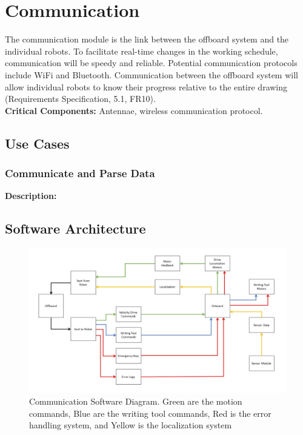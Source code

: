 
\section{Communication}
\label{sec:communication}
The communication module is the link between the offboard system and the individual robots. To facilitate real-time changes in the working schedule, communication will be speedy and reliable. Potential communication protocols include WiFi and Bluetooth. Communication between the offboard system will allow individual robots to know their progress relative to the entire drawing (Requirements Specification, 5.1, FR10). \\
\textbf{Critical Components:} Antennae, wireless communication protocol. \\

\subsection{Use Cases}
\subsubsection{Communicate and Parse Data}
\textbf{Description:} 


\subsection{Software Architecture}
\label{sec:sw_arch_communication}

\begin{figure}[h!]
 \centering
  \includegraphics[width=0.99\columnwidth]{diagrams/sw_arch_communication.jpg}
	\caption{Communication Software Diagram. Green are the motion commands, Blue are the writing tool commands, Red is the error handling system, and Yellow is the localization system}
 \label{fig:comm_processing}
\end{figure}

